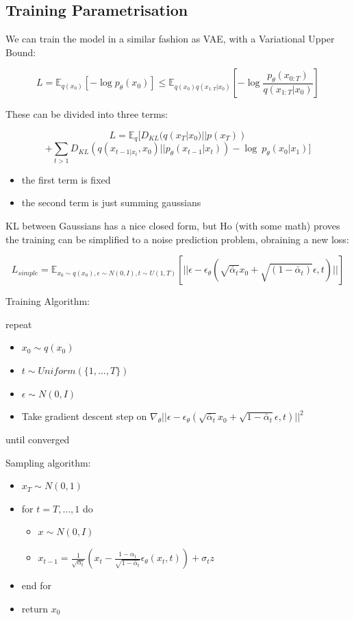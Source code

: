 \documentclass{article}
\begin{document}
\subsection{Training Parametrisation}\label{training-parametrisation}

We can train the model in a similar fashion as VAE, with a Variational
Upper Bound:

\[L=\mathbb{E}_{q(x_0)}[-\log p_\theta (x_0)]\le \mathbb{E}_{q(x_0)q(x_{1:T}|x_0)}[-\log \frac{p_{\theta}(x_{0:T})}{q(x_{1:T}|x_0)}]\]

These can be divided into three terms:

\[L=\mathbb{E}_q[D_{KL}(q(x_T|x_0)||p(x_T))\]
\[+\sum_{t>1}D_{KL}(q(x_{t-1|x_t}, x_0)||p_{\theta}(x_{t-1}|x_t))-\log\ p_{\theta}(x_0|x_1)]\]

\begin{itemize}
\tightlist
\item
  the first term is fixed
\item
  the second term is just summing gaussians
\end{itemize}

KL between Gaussians has a nice closed form, but Ho (with some math)
proves the training can be simplified to a noise prediction problem,
obraining a new loss:

\[L_{simple}=\mathbb{E}_{x_0\sim q(x_0), \epsilon \sim N(0, I), t\sim U(1, T)}[||\epsilon - \epsilon_\theta(\sqrt{\bar{\alpha}_t}x_0+\sqrt{(1-\bar{\alpha}_t)}\epsilon, t)||]\]

Training Algorithm:

repeat

\begin{itemize}
\tightlist
\item
  \(x_0 \sim q(x_0)\)
\item
  \(t \sim Uniform(\{ 1, ..., T \})\)
\item
  \(\epsilon \sim N(0, I)\)
\item
  Take gradient descent step on
  \(\nabla_\theta || \epsilon - \epsilon_\theta(\sqrt{\bar{\alpha}_t}x_0+\sqrt{1-\bar{\alpha}_t}\epsilon, t)||^2\)
\end{itemize}

until converged

Sampling algorithm:

\begin{itemize}
\tightlist
\item
  \(x_T \sim N(0, 1)\)
\item
  for \(t=T, ..., 1\) do

  \begin{itemize}
  \tightlist
  \item
    \(x\sim N(0, I)\)
  \item
    \(x_{t-1}=\frac{1}{\sqrt{\alpha_t}}(x_t-\frac{1-\alpha_t}{\sqrt{1-\bar{\alpha}_t}}\epsilon_\theta (x_t, t))+\sigma_t z\)
  \end{itemize}
\item
  end for
\item
  return \(x_0\)
\end{itemize}
\end{document}
